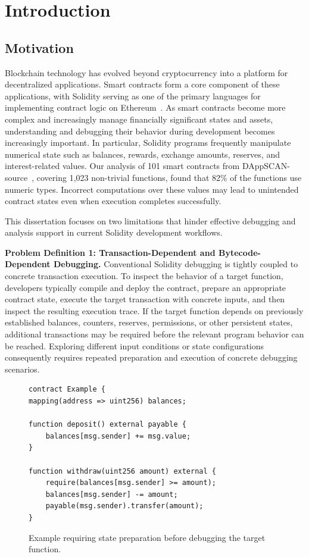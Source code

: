 \documentclass[11pt,oneside]{report}
\theoremstyle{plain}
\theoremstyle{definition}
\theoremstyle{remark}
\begin{document}
\chapter{Introduction}\label{chap:intro}

\section{Motivation}\label{sec:intro:motivation}

Blockchain technology has evolved beyond cryptocurrency into a platform for decentralized applications.
Smart contracts form a core component of these applications, with Solidity serving as one of the primary languages for implementing contract logic on Ethereum~\citep{solidity}.
As smart contracts become more complex and increasingly manage financially significant states and assets, understanding and debugging their behavior during development becomes increasingly important.
In particular, Solidity programs frequently manipulate numerical state such as balances, rewards, exchange amounts, reserves, and interest-related values.
Our analysis of 101 smart contracts from DAppSCAN-source~\citep{dappscananalysis,dappscan}, covering 1,023 non-trivial functions, found that 82\% of the functions use numeric types.
Incorrect computations over these values may lead to unintended contract states even when execution completes successfully.

This dissertation focuses on two limitations that hinder effective debugging and analysis support in current Solidity development workflows.

\smallskip
\noindent\textbf{Problem Definition 1: Transaction-Dependent and Bytecode-Dependent Debugging.}
Conventional Solidity debugging is tightly coupled to concrete transaction execution.
To inspect the behavior of a target function, developers typically compile and deploy the contract, prepare an appropriate contract state, execute the target transaction with concrete inputs, and then inspect the resulting execution trace.
If the target function depends on previously established balances, counters, reserves, permissions, or other persistent states, additional transactions may be required before the relevant program behavior can be reached.
Exploring different input conditions or state configurations consequently requires repeated preparation and execution of concrete debugging scenarios.

\begin{figure}[!t]
\centering
\begin{lstlisting}[language=Solidity]
contract Example {
mapping(address => uint256) balances;

function deposit() external payable {
    balances[msg.sender] += msg.value;
}

function withdraw(uint256 amount) external {
    require(balances[msg.sender] >= amount);
    balances[msg.sender] -= amount;
    payable(msg.sender).transfer(amount);
}
\end{lstlisting}
\caption{Example requiring state preparation before debugging the target function.}
\label{fig:intro:state-preparation-example}
\end{figure}
\end{document}
